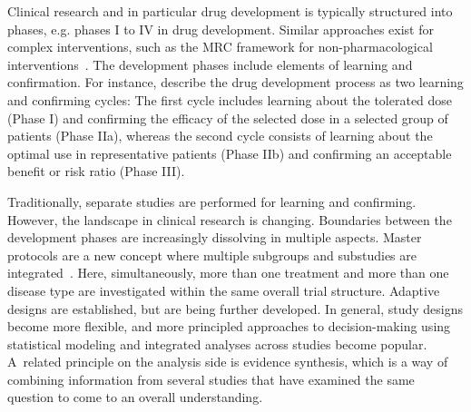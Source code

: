 \documentclass[bimj,fleqn]{w-art}
\theoremstyle{plain}
\theoremstyle{definition}
\begin{document}
Clinical research and in particular drug development is typically structured into phases, e.g. phases I to IV in drug development. 
Similar approaches exist for complex interventions, such as the MRC framework for non-pharmacological interventions~\citep{campbell_framework_2000}.
The development phases include elements of learning and confirmation.
For instance, \citet{sheiner_learning_1997} describe the drug development process as two learning and confirming cycles:
The first cycle includes learning about the tolerated dose (Phase I) and confirming the efficacy of the selected dose in a selected group of patients (Phase IIa), whereas the second cycle consists of learning about the optimal use in representative patients (Phase IIb) and confirming an acceptable benefit or risk ratio (Phase III).

Traditionally, separate studies are performed for learning and confirming.
However, the landscape in clinical research is changing.
Boundaries between the development phases are increasingly dissolving in multiple aspects.
Master protocols are a new concept where multiple subgroups and substudies are integrated~\citep{bogin_master_2020}.
Here, simultaneously, more than one treatment and more than one disease type are investigated within the same overall trial structure.
Adaptive designs are established, but are being further developed.
In general, study designs become more flexible, and more principled approaches to decision-making using statistical modeling and integrated analyses across studies become popular. 
A~related principle on the analysis side is evidence synthesis, which is a way of combining information from several studies that have examined the same question to come to an overall understanding.
\end{document}
